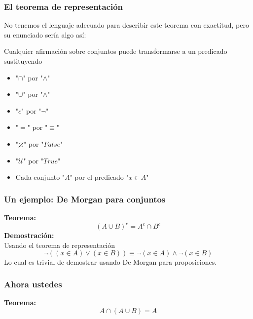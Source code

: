 \documentclass{beamer}
\begin{document}
\begin{frame}[fragile]
    \frametitle{El teorema de representación}
    \pause
    No tenemos el lenguaje adecuado para describir este teorema con exactitud,
    pero su enunciado sería algo así:
    \pause

    \begin{center}
        Cualquier afirmación sobre conjuntos puede transformarse a un predicado sustituyendo
    \pause
        \begin{itemize}
            \item "$\cap$" por "$\land$"
    \pause
            \item "$\cup$" por "$\land$"
    \pause
            \item "$c$" por "$\lnot$"
    \pause
            \item "$=$" por "$\equiv$"
    \pause
            \item "$\varnothing$" por "$False$"
    \pause
            \item "$\mathcal{U}$" por "$True$"
    \pause
            \item Cada conjunto "$A$" por el predicado "$x \in A$"
        \end{itemize}
    \end{center}
\end{frame}

\begin{frame}[fragile]
    \frametitle{Un ejemplo: De Morgan para conjuntos}
    \pause
    \textbf{Teorema:}
    $$(A \cup B)^c = A^c \cap B^c$$
    \pause
    \textbf{Demostración:} \\
    \pause
    Usando el teorema de representación
    \pause
    $$\lnot((x \in A) \lor (x \in B)) \equiv \lnot(x \in A) \land \lnot(x \in B)$$
    \pause
    Lo cual es trivial de demostrar usando De Morgan para proposiciones.
\end{frame}

\begin{frame}[fragile]
    \frametitle{Ahora ustedes}
    \pause
    \textbf{Teorema:}
    $$A \cap (A \cup B) = A$$
    \vspace{165pt}
\end{frame}
\end{document}
